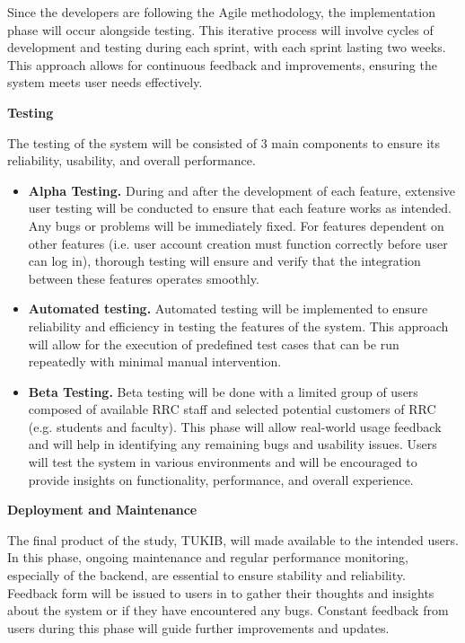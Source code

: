 Since the developers are following the Agile methodology, the implementation phase will occur alongside testing. This iterative process will involve cycles of development and testing during each sprint, with each sprint lasting two weeks. This approach allows for continuous feedback and improvements, ensuring the system meets user needs effectively.\newline
	
\noindent\textbf{Testing}

\noindent The testing of the system will be consisted of 3 main components to ensure its reliability, usability, and overall performance.

\begin{itemize}
	\item \textbf{Alpha Testing.} During and after the development of each feature, extensive user testing will be conducted to ensure that each feature works as intended. Any bugs or problems will be immediately fixed. For features dependent on other features (i.e. user account creation must function correctly before user can log in), thorough testing will ensure and verify that the integration between these features operates smoothly.
	
	\item \textbf{Automated testing.} Automated testing will be implemented to ensure reliability and efficiency in testing the features of the system. This approach will allow for the execution of predefined test cases that can be run repeatedly with minimal manual intervention.
	
	\item \textbf{Beta Testing.}  Beta testing will be done with a limited group of users composed of available RRC staff and selected potential customers of RRC (e.g. students and faculty). This phase will allow real-world usage feedback and will help in identifying any remaining bugs and usability issues. Users will test the system in various environments and will be encouraged to provide insights on functionality, performance, and overall experience.\newline
\end{itemize}
	
\noindent\textbf{Deployment and Maintenance}

\noindent The final product of the study, TUKIB, will made available to the intended users. In this phase, ongoing maintenance and regular performance monitoring, especially of the backend, are essential to ensure stability and reliability. Feedback form will be issued to users in to gather their thoughts and insights about the system or if they have encountered any bugs. Constant feedback from users during this phase will guide further improvements and updates.

